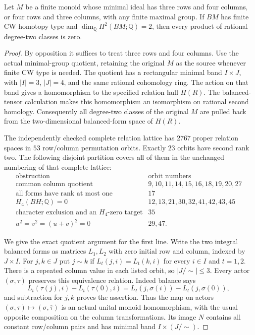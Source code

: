 \begin{theorem}
\label{CP2:A-three-by-four-rank-two}
Let $M$ be a finite monoid whose minimal ideal has three rows
and four columns, or four rows and three columns, with any
finite maximal group. If $BM$ has finite CW homotopy type
and $\dim_{\mathbb Q}H^2(BM;\mathbb Q)=2$, then every product
of rational degree-two classes is zero.
\end{theorem}
\begin{proof}
By opposition it suffices to treat three rows and four columns.
Use the actual minimal-group quotient, retaining the original
$M$ as the source whenever finite CW type is needed. The
quotient has a rectangular minimal band $I\times J$, with
$|I|=3$, $|J|=4$, and the same rational cohomology ring.
The action on that band gives a homomorphism to the specified
relation hull $H(R)$. The balanced-tensor calculation makes
this homomorphism an isomorphism on rational second homology.
Consequently all degree-two classes of the original $M$ are
pulled back from the two-dimensional balanced-form space of
$H(R)$.

The independently checked complete relation lattice
has $2767$ proper relation spaces in $53$ row/column
permutation orbits. Exactly $23$ orbits have second rank two.
The following disjoint partition covers all of them in the
unchanged numbering of that complete lattice:
\[
\begin{array}{l|l}
\text{obstruction}&\text{orbit numbers}\\\hline
\text{common column quotient}&9,10,11,14,15,16,18,19,20,27\\
\text{all forms have rank at most one}&17\\
H_4(BH;\mathbb Q)=0&12,13,21,30,32,41,42,43,45\\
\text{character exclusion and an }H_4\text{-zero target}&35\\
u^2=v^2=(u+v)^2=0&29,47.
\end{array}
\]

We give the exact quotient argument for the first line.
Write the two integral balanced forms as matrices $L_1,L_2$
with zero initial row and column, indexed by $J\times I$.
For $j,k\in J$ put $j\sim k$ if
$L_t(j,i)=L_t(k,i)$ for every $i\in I$ and $t=1,2$.
There is a repeated column value in each listed orbit, so
$|J/{\sim}|\leq3$. Every actor $(\sigma,\tau)$ preserves
this equivalence relation. Indeed balance says
\[
 L_t(\tau(j),i)-L_t(\tau(0),i)
   =L_t(j,\sigma(i))-L_t(j,\sigma(0)),
\]
and subtraction for $j,k$ proves the assertion.
Thus the map on actors
$(\sigma,\tau)\mapsto(\sigma,\overline\tau)$ is an actual
unital monoid homomorphism, with the usual opposite
composition on the column transformations. Its image $N$
contains all constant row/column pairs and has minimal band
$I\times(J/{\sim})$.


\end{proof}
